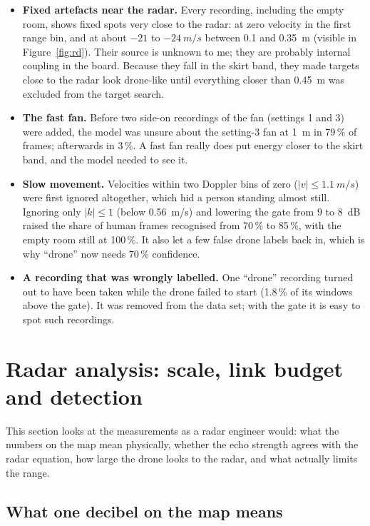 \documentclass[11pt,a4paper]{article}
\begin{document}
\begin{itemize}
\item \textbf{Fixed artefacts near the radar.} Every recording, including the empty room, shows fixed spots very close to the radar: at zero velocity in the first range bin, and at about $-21$ to $\SI{-24}{m/s}$ between 0.1 and \SI{0.35}{m} (visible in Figure~\ref{fig:rd}). Their source is unknown to me; they are probably internal coupling in the board. Because they fall in the skirt band, they made targets close to the radar look drone-like until everything closer than \SI{0.45}{m} was excluded from the target search.
\item \textbf{The fast fan.} Before two side-on recordings of the fan (settings 1 and 3) were added, the model was unsure about the setting-3 fan at \SI{1}{m} in 79\,\% of frames; afterwards in 3\,\%. A fast fan really does put energy closer to the skirt band, and the model needed to see it.
\item \textbf{Slow movement.} Velocities within two Doppler bins of zero ($|v| \le \SI{1.1}{m/s}$) were first ignored altogether, which hid a person standing almost still. Ignoring only $|k| \le 1$ (below \SI{0.56}{m/s}) and lowering the gate from 9 to \SI{8}{dB} raised the share of human frames recognised from 70\,\% to 85\,\%, with the empty room still at 100\,\%. It also let a few false drone labels back in, which is why ``drone'' now needs 70\,\% confidence.
\item \textbf{A recording that was wrongly labelled.} One ``drone'' recording turned out to have been taken while the drone failed to start (1.8\,\% of its windows above the gate). It was removed from the data set; with the gate it is easy to spot such recordings.
\end{itemize}

\section{Radar analysis: scale, link budget and detection}\label{sec:analysis}

This section looks at the measurements as a radar engineer would: what the numbers on the map mean physically, whether the echo strength agrees with the radar equation, how large the drone looks to the radar, and what actually limits the range.

\subsection{What one decibel on the map means}\label{sec:scale}
\end{document}
